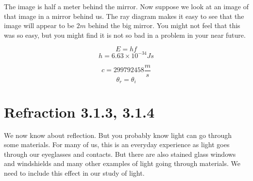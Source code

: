 \documentclass{article}
\begin{document}
The image is half a meter behind the mirror. Now suppose we look at an image
of that image in a mirror behind us. The ray diagram makes it easy to
see that the image will appear to be $2\unit{m}$ behind the big mirror. You
might not feel that this was so easy, but you might find it is not so bad in
a problem in your near future.

\vspace{0.5in}%
\begin{equation}
E=hf
\end{equation}
\begin{equation}
h=6.63\times 10^{-34}\unit{J}\unit{s}
\end{equation}

\[
c=299792458\frac{\unit{m}}{\unit{s}}
\]%
\[
\theta _{r}=\theta _{i}
\]

\section{Refraction 3.1.3, 3.1.4}

We now know about reflection. But you probably know light can go through
some materials. For many of us, this is an everyday experience as light goes
through our eyeglasses and contacts. But there are also stained glass
windows and windshields and many other examples of light going through
materials. We need to include this effect in our study of light.

\end{document}
